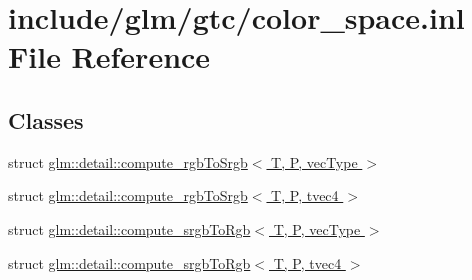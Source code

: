 \hypertarget{gtc_2color__space_8inl}{}\section{include/glm/gtc/color\+\_\+space.inl File Reference}
\label{gtc_2color__space_8inl}
\subsection*{Classes}
\begin{DoxyCompactItemize}
\item 
struct \hyperlink{structglm_1_1detail_1_1compute__rgbToSrgb}{glm\+::detail\+::compute\+\_\+rgb\+To\+Srgb$<$ T, P, vec\+Type $>$}
\item 
struct \hyperlink{structglm_1_1detail_1_1compute__rgbToSrgb_3_01T_00_01P_00_01tvec4_01_4}{glm\+::detail\+::compute\+\_\+rgb\+To\+Srgb$<$ T, P, tvec4 $>$}
\item 
struct \hyperlink{structglm_1_1detail_1_1compute__srgbToRgb}{glm\+::detail\+::compute\+\_\+srgb\+To\+Rgb$<$ T, P, vec\+Type $>$}
\item 
struct \hyperlink{structglm_1_1detail_1_1compute__srgbToRgb_3_01T_00_01P_00_01tvec4_01_4}{glm\+::detail\+::compute\+\_\+srgb\+To\+Rgb$<$ T, P, tvec4 $>$}
\end{DoxyCompactItemize}
